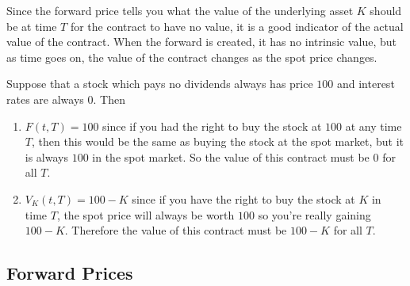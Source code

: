 \documentclass{article}
\begin{document}
    Since the forward price tells you what the value of the underlying asset $K$ should be at time $T$ for the contract to have no value, it is a good indicator of the actual value of the contract. When the forward is created, it has no intrinsic value, but as time goes on, the value of the contract changes as the spot price changes.

    \begin{example}
      Suppose that a stock which pays no dividends always has price $100$ and interest rates are always $0$. Then 
      \begin{enumerate}
        \item $F(t, T) = 100$ since if you had the right to buy the stock at $100$ at any time $T$, then this would be the same as buying the stock at the spot market, but it is always $100$ in the spot market. So the value of this contract must be $0$ for all $T$. 
        \item $V_K (t, T) = 100 - K$ since if you have the right to buy the stock at $K$ in time $T$, the spot price will always be worth $100$ so you're really gaining $100 - K$. Therefore the value of this contract must be $100 - K$ for all $T$. 
      \end{enumerate}
    \end{example}

  \subsection{Forward Prices}
\end{document}
